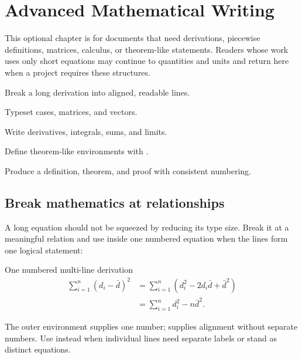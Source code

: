 \chapter{Advanced Mathematical Writing}
\label{chap:advanced-math}

This optional chapter is for documents that need derivations, piecewise
definitions, matrices, calculus, or theorem-like statements. Readers whose
work uses only short equations may continue to quantities and units and return
here when a project requires these structures.

\begin{learningoutcomes}
  \item Break a long derivation into aligned, readable lines.
  \item Typeset cases, matrices, and vectors.
  \item Write derivatives, integrals, sums, and limits.
  \item Define theorem-like environments with .
  \item Produce a definition, theorem, and proof with consistent numbering.
\end{learningoutcomes}

\section{Break mathematics at relationships}

A long equation should not be squeezed by reducing its type size. Break it at a
meaningful relation and use  inside one numbered equation when
the lines form one logical statement:

\begin{latexcode}{One numbered multi-line derivation}
\begin{equation}
\begin{aligned}
  \sum_{i=1}^{n}(d_i-\bar d)^2
    &= \sum_{i=1}^{n}(d_i^2-2d_i\bar d+\bar d^2) \\
    &= \sum_{i=1}^{n}d_i^2-n\bar d^2.
\end{aligned}
\end{equation}
\end{latexcode}

The outer environment supplies one number;  supplies alignment
without separate numbers. Use  instead when individual lines need
separate labels or stand as distinct equations.

